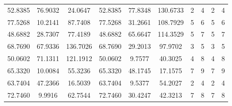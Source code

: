 \documentclass[withoutpreface,bwprint]{cumcmthesis} %
\begin{document}
\begin{appendices}
\begin{table}[htbp!]
\begin{tabular}{@{}cccccccccc@{}}
							52.8385                          & 76.9032                          & 24.0647                          & 52.8385                          & 77.8348                          & 130.6733                         & 2                    & 4                    & 2                      & 4                      \\
							77.5268                          & 10.2141                          & 87.7408                          & 77.5268                          & 31.2661                          & 108.7929                         & 5                    & 6                    & 5                      & 6                      \\ \cmidrule(lr){7-7}
							48.6882                          & 28.7307                          & 77.4189                          & 48.6882                          & 65.6647                          & 114.3529                         & 5                    & 7                    & 5                      & 7                      \\
							68.7690                          & 67.9336                          & 136.7026                         & 68.7690                          & 29.2013                          & 97.9702                          & 3                    & 5                    & 3                      & 5                      \\
							50.0602                          & 71.1311                          & 121.1912                         & 50.0602                          & 9.7577                           & 40.3025                          & 4                    & 8                    & 4                      & 8                      \\
							65.3320                          & 10.0084                          & 55.3236                          & 65.3320                          & 48.1745                          & 17.1575                          & 7                    & 9                    & 7                      & 9                      \\
							63.7404                          & 47.2366                          & 16.5039                          & 63.7404                          & 9.5377                           & 54.2027                          & 2                    & 4                    & 2                      & 4                      \\
							72.7460                          & 9.9916                           & 62.7544                          & 72.7460                          & 30.4247                          & 42.3213                          & 7                    & 8                    & 7                      & 8                      \\

\end{tabular}
\end{table}
\end{appendices}
\end{document}
